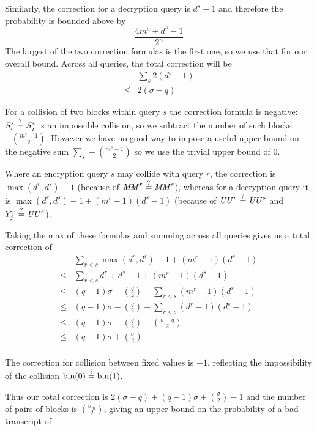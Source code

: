 \documentclass[hctr.tex]{subfiles}
\begin{document}
Similarly, the correction for a decryption query is
\(d^s - 1\) and therefore  the probability 
is bounded above by
\begin{displaymath}
    \frac{4m^s + d^s -1}{2^n}
\end{displaymath}
The largest of the two correction formulas is
the first one, so we use that for our overall bound.
Across all queries, the total
correction will be
\begin{align*}
    &\sum_s 2(d^s - 1) \\
    \leq & 2(\sigma - q)
\end{align*}

For a collision of two blocks within query \(s\)
the correction formula is negative:
\(S_i^s \stackrel{\text{?}}{=} S_j^s\) is an impossible collision, 
so we subtract the number of such blocks:
\(-\binom{m^s -1}{2}\). However we have no good way
to impose a useful upper bound on the negative sum
\(\sum_s-\binom{m^s -1}{2}\) so we use the
trivial upper bound of 0.

Where an encryption query \(s\)
may collide with query \(r\), the correction is 
\(\max(d^r, d^s) -1\)
(because of \(\mathit{MM}^r \stackrel{\text{?}}{=} \mathit{MM}^s\)), whereas for a decryption query
it is \(\max(d^r, d^s) -1 + (m^r -1 )(d^s -1)\)
(because of \(\mathit{UU}^r \stackrel{\text{?}}{=} \mathit{UU}^s\) and \(Y_j^r \stackrel{\text{?}}{=} \mathit{UU}^s\)).

Taking the max of these formulas and summing across
all queries gives us a total correction of
\begin{align*}
    &\sum_{r < s} \max(d^r, d^s) -1 + (m^r -1 )(d^s -1)\\
    \leq & \sum_{r < s} d^r + d^s -1 + (m^r -1 )(d^s -1)\\
    \leq & (q-1)\sigma - \binom{q}{2} + \sum_{r < s} (m^r -1 )(d^s -1) \\
    \leq & (q-1)\sigma - \binom{q}{2} + \sum_{r < s} (d^r -1)(d^s -1) \\
    \leq & (q-1)\sigma - \binom{q}{2} + \binom{\sigma - q}{2} \\
   \leq & (q-1)\sigma + \binom{\sigma}{2} \\
\end{align*}

The correction for collision between fixed values
is \(-1\), reflecting the impossibility of the collision
\(\operatorname{bin}(0) \stackrel{\text{?}}{=} \operatorname{bin}(1)\).

Thus our total correction is
\(2(\sigma - q) + (q-1)\sigma + \binom{\sigma}{2} -1\)
and the number of pairs of blocks is \(\binom{\sigma_m}{2}\), 
giving an upper bound
on the probability of a bad transcript of
\end{document}
